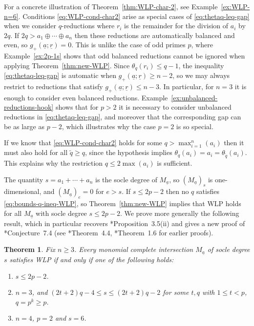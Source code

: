 \documentclass[11pt,reqno]{amsart}
\newcommand{\defi}[1]{{\upshape\sffamily #1}}
\newcommand{\ul}[1]{\underline{#1}}
\newtheorem{theorem}{Theorem}[section]
\theoremstyle{definition}
\theoremstyle{remark}
\numberwithin{equation}{section}
\begin{document}
For a concrete illustration of Theorem~\ref{thm:WLP-char-2}, see Example~\ref{ex:WLP-n=6}. Conditions \eqref{eq:WLP-cond-char2} arise as special cases of \eqref{eq:thetaq-leq-gap} when we consider $q$-reductions where $r_i$ is the remainder for the division of $a_i$ by $2q$. If  $2q>a_1\oplus\cdots\oplus a_n$ then these reductions are automatically balanced and even, so $g_+(\ul{a};\ul{r})=0$. This is unlike the case of odd primes $p$, where Example~\ref{ex:2p-1s} shows that odd balanced reductions cannot be ignored when applying Theorem~\ref{thm:new-WLP}. Since $\theta_q(r_i)\leq q-1$, the inequality \eqref{eq:thetaq-leq-gap} is automatic when $g_+(\ul{a};\ul{r})\geq n-2$, so we may always restrict to reductions that satisfy $g_+(\ul{a};\ul{r})\leq n-3$. In particular, for $n = 3$ it is enough to consider even balanced reductions. Example~\ref{ex:unbalanced-reductions-hook} shows that for $p>2$ it is necessary to consider unbalanced reductions in \eqref{eq:thetaq-leq-gap}, and moreover that the corresponding gap can be as large as $p-2$, which illustrates why the case $p=2$ is so special.

If we know that \eqref{eq:WLP-cond-char2} holds for some $q>\max_{i=1}^n(a_i)$ then it must also hold for all $\tilde{q}\geq q$, since the hypothesis implies $\theta_q(a_i)=a_i=\theta_{\tilde{q}}(a_i)$. This explains why the restriction $q\leq 2\max(a_i)$ is sufficient.

The quantity $s = a_1+\cdots+a_n$ is the \defi{socle degree of $M_{\ul{a}}$}, so $(M_{\ul{a}})_s$ is one-dimensional, and $(M_{\ul{a}})_e=0$ for $e>s$. If $s\leq 2p-2$ then no $q$ satisfies \eqref{eq:bounds-q-ineq-WLP}, so Theorem~\ref{thm:new-WLP} implies that WLP holds for all $M_{\ul{a}}$ with socle degree $s\leq 2p-2$. We prove more generally the following result, which in particular recovers \cite{Cook12}*{Proposition~3.5(ii)} and gives a new proof of \cite{Cook12}*{Conjecture~7.4} (see \cite{lund-nick}*{Theorem~4.4}, \cite{Vraciu}*{Theorem~1.6} for earlier proofs).

\begin{theorem}\label{thm:WLP-from-socle}
 Fix $n\geq 3$. Every monomial complete intersection $M_{\ul{a}}$ of socle degree $s$ satisfies WLP if and only if one of the following holds:
 \begin{enumerate}
     \item $s\leq 2p-2$.
     \item $n=3$, and $(2t+2)q-4 \leq s\leq (2t+2)q-2$ for some $t,q$ with $1\leq t<p$, $q=p^k\geq p$.
     \item $n=4$, $p=2$ and $s=6$.
 \end{enumerate}
\end{theorem}
\end{document}

